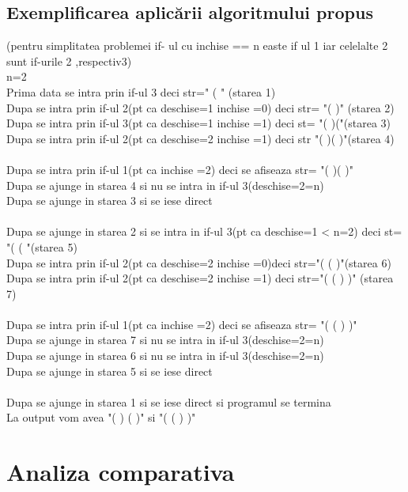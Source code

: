 \documentclass[runningheads]{llncs}
\begin{document}
\subsection{Exemplificarea aplicării algoritmului propus}
(pentru simplitatea problemei if- ul cu inchise == n easte if ul 1 iar celelalte 2 sunt if-urile 2 ,respectiv3)\\
n=2\\
Prima data se intra prin if-ul 3 deci str=" ( " (starea 1) \\
Dupa se intra prin if-ul 2(pt ca deschise=1 inchise =0) deci str= "( )" (starea 2)\\
Dupa se intra prin if-ul 3(pt ca deschise=1 inchise =1) deci st= "( )("(starea 3)\\
Dupa se intra prin if-ul 2(pt ca deschise=2 inchise =1) deci str "( )( )"(starea 4)\\
\\
Dupa se intra prin if-ul 1(pt ca inchise =2) deci se afiseaza str= "( )( )"\\
Dupa se ajunge in starea 4 si nu se intra in if-ul 3(deschise=2=n)\\
Dupa se ajunge in starea 3 si se iese direct\\
\\
Dupa se ajunge in starea 2 si se intra in if-ul 3(pt ca deschise=1 < n=2) deci st= "( ( "(starea 5)\\
Dupa se intra prin if-ul 2(pt ca deschise=2 inchise =0)deci str="( ( )"(starea 6)\\
Dupa se intra prin if-ul 2(pt ca deschise=2 inchise =1) deci str="( ( ) )" (starea 7)\\
\\
Dupa se intra prin if-ul 1(pt ca inchise =2) deci se afiseaza str= "( ( ) )"\\
Dupa se ajunge in starea 7 si nu se intra in if-ul 3(deschise=2=n)\\
Dupa se ajunge in starea 6 si nu se intra in if-ul 3(deschise=2=n)\\
Dupa se ajunge in starea 5 si se iese direct\\
\\
Dupa se ajunge in starea 1 si se iese direct si programul se termina\\
La output vom avea "( ) ( )" si "( ( ) )"

\newpage
\section{Analiza comparativa}
\end{document}

